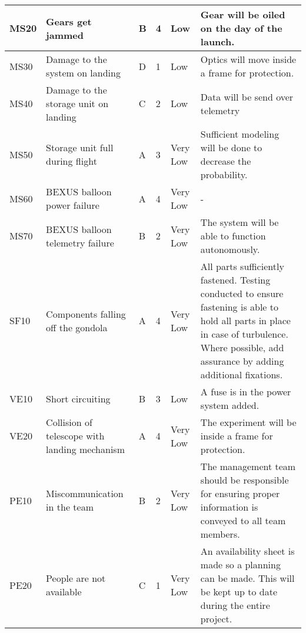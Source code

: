 \begin{longtable}{|m{}| m{} |m{} |m{}|m{}| m{}|}
MS20 & Gears get jammed														& B & 4 & \cellcolor[HTML]{FCFF2F}Low			& Gear will be oiled on the day of the launch. \\\hline

MS30 & Damage to the system on landing										& D & 1 & \cellcolor[HTML]{FCFF2F}Low			& Optics will move inside a frame for protection.\\\hline

MS40 & Damage to the storage unit on landing									& C & 2 & \cellcolor[HTML]{FCFF2F}Low			& Data will be send over telemetry\\\hline

MS50 & Storage unit full during flight											& A & 3 & \cellcolor[HTML]{34FF34}Very Low	& Sufficient modeling will be done to decrease the probability.\\\hline

MS60 & BEXUS balloon power failure											& A & 4 & \cellcolor[HTML]{34FF34}Very Low	& -\\\hline

MS70 & BEXUS balloon telemetry failure										& B & 2 & \cellcolor[HTML]{34FF34}Very Low	& The system will be able to function autonomously.\\\hline


SF10 & Components falling off the gondola									& A & 4 & \cellcolor[HTML]{34FF34}Very Low	& All parts sufficiently fastened. Testing conducted to ensure fastening is able to hold all parts in place in case of turbulence. Where possible, add assurance by adding additional fixations.\\\hline


VE10 & Short circuiting														& B & 3 & \cellcolor[HTML]{FCFF2F}Low			& A fuse is in the power system added.\\\hline

VE20 & Collision of telescope with landing mechanism						& A & 4 & \cellcolor[HTML]{34FF34}Very Low	& The experiment will be inside a frame for protection.\\\hline


PE10 & Miscommunication in the team											& B & 2 & \cellcolor[HTML]{34FF34}Very Low	& The management team should be responsible for ensuring proper information is conveyed to all team members.\\\hline

PE20 & People are not available												& C & 1 & \cellcolor[HTML]{34FF34}Very Low	& An availability sheet is made so a planning can be made. This will be kept up to date during the entire project.\\\hline


\end{longtable}
